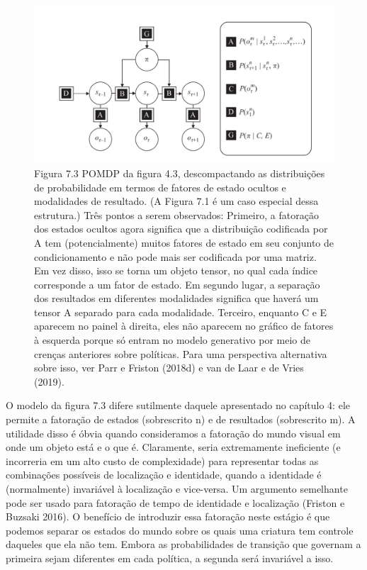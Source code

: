 \documentclass[
  12pt,
]{book}
\begin{document}
\begin{figure}
\centering
\includegraphics{images/Figura_7_3.png}
\caption{Figura 7.3 POMDP da figura 4.3, descompactando as distribuições de probabilidade em termos de fatores de estado ocultos e modalidades de resultado. (A Figura 7.1 é um caso especial dessa estrutura.) Três pontos a serem observados: Primeiro, a fatoração dos estados ocultos agora significa que a distribuição codificada por A tem (potencialmente) muitos fatores de estado em seu conjunto de condicionamento e não pode mais ser codificada por uma matriz. Em vez disso, isso se torna um objeto tensor, no qual cada índice corresponde a um fator de estado. Em segundo lugar, a separação dos resultados em diferentes modalidades significa que haverá um tensor A separado para cada modalidade. Terceiro, enquanto C e E aparecem no painel à direita, eles não aparecem no gráfico de fatores à esquerda porque só entram no modelo generativo por meio de crenças anteriores sobre políticas. Para uma perspectiva alternativa sobre isso, ver Parr e Friston (2018d) e van de Laar e de Vries (2019).}
\end{figure}

O modelo da figura 7.3 difere sutilmente daquele apresentado no capítulo 4: ele permite a fatoração de estados (sobrescrito n) e de resultados (sobrescrito m). A utilidade disso é óbvia quando consideramos a fatoração do mundo visual em onde um objeto está e o que é. Claramente, seria extremamente ineficiente (e incorreria em um alto custo de complexidade) para representar todas as combinações possíveis de localização e identidade, quando a identidade é (normalmente) invariável à localização e vice-versa. Um argumento semelhante pode ser usado para fatoração de tempo de identidade e localização (Friston e Buzsaki 2016). O benefício de introduzir essa fatoração neste estágio é que podemos separar os estados do mundo sobre os quais uma criatura tem controle daqueles que ela não tem. Embora as probabilidades de transição que governam a primeira sejam diferentes em cada política, a segunda será invariável a isso.
\end{document}
